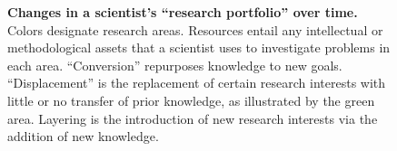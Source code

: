 \documentclass{article}
\begin{document}
\begin{figure}[h]

    \caption{\textbf{Changes in a scientist's ``research portfolio'' over time.} Colors designate research areas. Resources entail any intellectual or methodological assets that a scientist uses to investigate problems in each area. ``Conversion'' repurposes knowledge to new goals. ``Displacement'' is the replacement of certain research interests with little or no transfer of prior knowledge, as illustrated by the green area. Layering is the introduction of new research interests via the addition of new knowledge.}
    \label{fig:research-agenda}
\end{figure}
\end{document}
